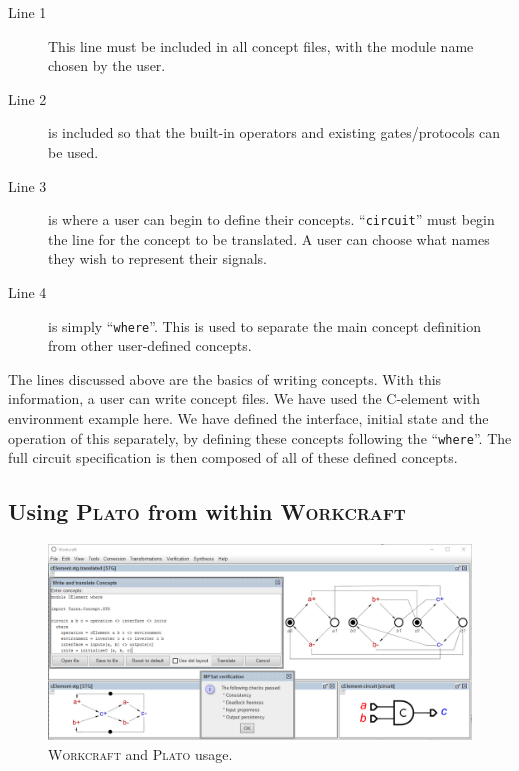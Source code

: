 \documentclass[british,conference,compsoc]{IEEEtran}
\newcommand{\noun}[1]{\textsc{#1}}
\begin{document}
\begin{description}
  \item [Line 1]  This line must be included in all concept files, with the 
  module name chosen by the user.
  
  \item [Line 2] is included so that the built-in operators and existing 
  gates/protocols can be used. 
  
  \item [Line 3] is where a user can begin to define their concepts. 
  ``\texttt{circuit}'' must begin the line for the concept to be translated.
  A user can choose what names they wish to represent their signals.
  
  \item [Line 4] is simply ``\texttt{where}''. This is used to separate the main
  concept definition from other user-defined concepts.

\end{description}

\vspace{-1mm}

The lines discussed above are the basics of writing concepts. With this 
information, a user can write concept files. We have used the 
C-element with environment example here. We have defined the interface, initial 
state and the operation of this separately, by defining these concepts following the 
``\texttt{where}''. The full circuit specification is then 
composed of all of these defined concepts. 

\subsection{Using \noun{Plato} from within \noun{Workcraft} \label{sec:workcraft_usage}}

\vspace{-3mm}

\begin{figure}[t]
\begin{centering}
\vspace{-3mm}
\includegraphics[scale=0.55]{Images/workcraft_design_flow.png}
\par\end{centering}
\begin{centering}
\protect\caption{\label{fig:design_flow_screenshot}\noun{Workcraft} and 
			\noun{Plato} usage.}
\par\end{centering}
\vspace{-3mm}
\end{figure}
\end{document}

